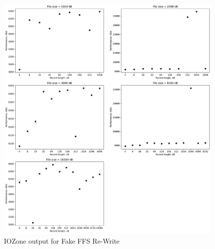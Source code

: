 \begin{figure}[!htb]
	\label{fig:app_bench_fffs_rnd_read}
	\begin{center}
		\includegraphics[width=1.0\textwidth]{figures/benchmarking/fake-ffs/Re-Writer.pdf}
	\end{center}
	\caption{IOZone output for Fake FFS Re-Write}
\end{figure}

